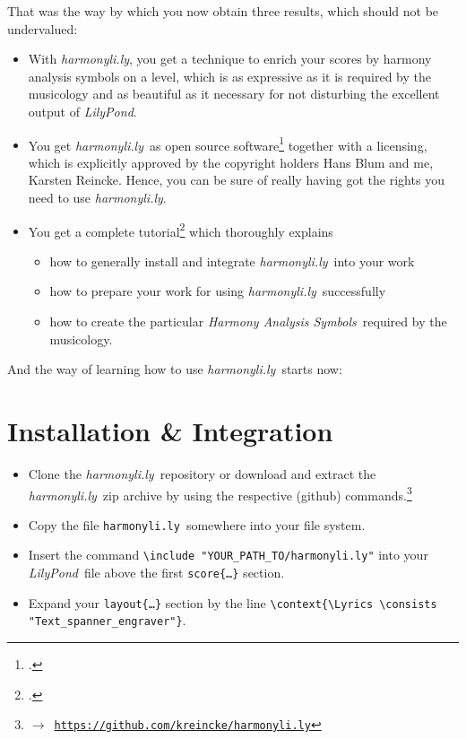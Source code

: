 \documentclass[
  DIV=calc,
  BCOR=5mm,
  12pt,
  headings=small,
  oneside,
  abstract=true,
  toc=bib,
  xcolor=dvipsnames,
  openany,
  english]{scrartcl}
\newcommand{\acc}[0]{\textit}
\newcommand{\ra}[0]{$\rightarrow$}
\newcommand{\lnkr}[1]{\ra\ \href{#1}{\texttt{#1}}}
\newcommand{\hlyn}[0]{\textit{harmonyli.ly}}
\newcommand{\hlyf}[0]{\texttt{harmonyli.ly}}
\newcommand{\lily}[0]{\textit{LilyPond}}
\newcommand{\has}[1]{\textit{Harmony Analysis Symbol#1}}
\begin{document}
That was the way by which you now obtain three results, which should not be
undervalued:
\begin{itemize}
  \item With \hlyn, you get a technique to enrich your scores by
  harmony analysis symbols on a level, which is as expressive as it is required
  by the musicology and as beautiful as it necessary for not disturbing the
  excellent output of \acc{LilyPond}.
  \item You get \hlyn\ as open source software\footcite[cf.][\nopage wp]{ReinckeBlum2019a} together with a licensing, which is explicitly approved
  by the copyright holders Hans Blum and me, Karsten Reincke. Hence, you can be
  sure of really having got the rights you need to use \hlyn.
  \item You get a complete tutorial\footcite[cf.][\nopage wp]{Reincke2019b} which
  thoroughly explains
  \begin{itemize}
    \item how to generally install and integrate \hlyn\ into your work
    \item how to prepare your work for using \hlyn\ successfully
    \item how to create the particular \has{s}\ required by the musicology.
  \end{itemize}
\end{itemize}

And the way of learning how to use \hlyn\ starts now:

\section{Installation \& Integration}
\begin{itemize}
  \item Clone the \hlyn\ repository or download and extract the \hlyn\ zip
  archive by using the respective (github)
  commands.\footnote{\lnkr{https://github.com/kreincke/harmonyli.ly}}
  \item Copy the file \hlyf\ somewhere into your file system.
  \item Insert the command \texttt{\textbackslash include
  "YOUR\_PATH\_TO/harmonyli.ly"} into
  your \lily\ file above the first \texttt{score\{\ldots\}} section.
  \item Expand your \texttt{layout\{\ldots\}} section by the line
   \texttt{\textbackslash context\{\textbackslash Lyrics \textbackslash consists
   "Text\_spanner\_engraver"\}}.
\end{itemize}
\end{document}
